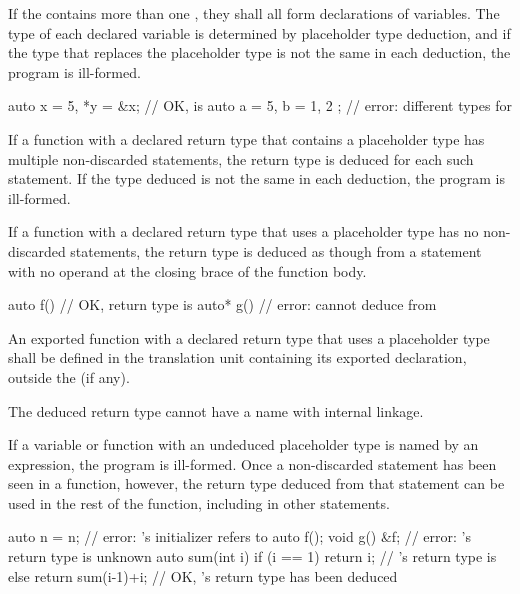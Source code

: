 \pnum
If the  contains more than one
, they shall all form declarations of
variables. The type of each declared variable is determined
by placeholder type deduction,
and if the type that replaces the placeholder type is not the
same in each deduction, the program is ill-formed.

\begin{example}
\begin{codeblock}
auto x = 5, *y = &x;            // OK,  is 
auto a = 5, b = { 1, 2 };       // error: different types for 
\end{codeblock}
\end{example}

\pnum
If a function with a declared return type that contains a placeholder type has
multiple non-discarded  statements, the return type is deduced for each
such  statement. If the type deduced is not the same in each
deduction, the program is ill-formed.

\pnum
If a function with a declared return type that uses a placeholder type has no
non-discarded  statements, the return type is deduced as though from a
 statement with no operand at the closing brace of the function
body.
\begin{example}
\begin{codeblock}
auto  f() { }                   // OK, return type is 
auto* g() { }                   // error: cannot deduce  from 
\end{codeblock}
\end{example}

\pnum
An exported function
with a declared return type that uses a placeholder type
shall be defined in the translation unit
containing its exported declaration,
outside the  (if any).
\begin{note}
The deduced return type cannot have
a name with internal linkage.
\end{note}

\pnum
If a variable or function with an undeduced placeholder type is named by an
expression, the program is ill-formed.  Once a
non-discarded  statement has been seen in a function, however, the return type deduced
from that statement can be used in the rest of the function, including in other
 statements.
\begin{example}
\begin{codeblock}
auto n = n;                     // error: 's initializer refers to 
auto f();
void g() { &f; }                // error: 's return type is unknown
auto sum(int i) {
  if (i == 1)
    return i;                   // 's return type is 
  else
    return sum(i-1)+i;          // OK, 's return type has been deduced
}
\end{codeblock}
\end{example}

